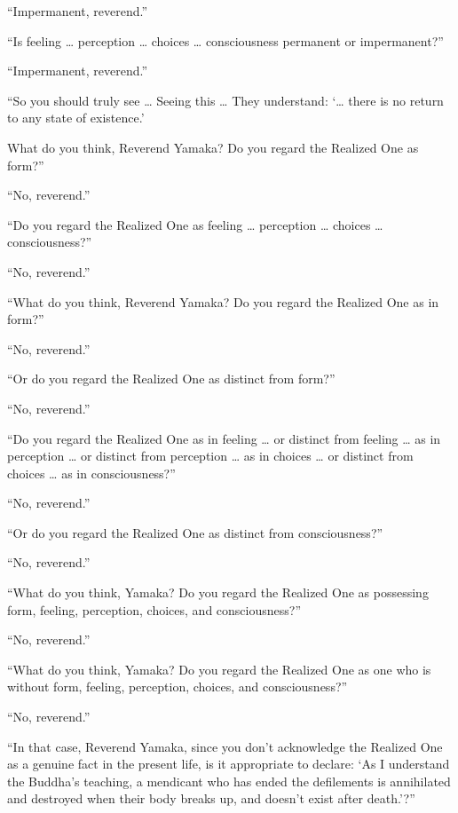 \documentclass[12pt,openany]{book}%
\begin{document}
“Impermanent, reverend.” 

“Is feeling … perception … choices … consciousness permanent or impermanent?” 

“Impermanent, reverend.” 

“So you should truly see … Seeing this … They understand: ‘… there is no return to any state of existence.’ 

What do you think, Reverend Yamaka? Do you regard the Realized One as form?” 

“No, reverend.” 

“Do you regard the Realized One as feeling … perception … choices … consciousness?” 

“No, reverend.” 

“What do you think, Reverend Yamaka? Do you regard the Realized One as in form?” 

“No, reverend.” 

“Or do you regard the Realized One as distinct from form?” 

“No, reverend.” 

“Do you regard the Realized One as in feeling … or distinct from feeling … as in perception … or distinct from perception … as in choices … or distinct from choices … as in consciousness?” 

“No, reverend.” 

“Or do you regard the Realized One as distinct from consciousness?” 

“No, reverend.” 

“What do you think, Yamaka? Do you regard the Realized One as possessing form, feeling, perception, choices, and consciousness?” 

“No, reverend.” 

“What do you think, Yamaka? Do you regard the Realized One as one who is without form, feeling, perception, choices, and consciousness?” 

“No, reverend.” 

“In that case, Reverend Yamaka, since you don’t acknowledge the Realized One as a genuine fact in the present life, is it appropriate to declare: ‘As I understand the Buddha’s teaching, a mendicant who has ended the defilements is annihilated and destroyed when their body breaks up, and doesn’t exist after death.’?” 
\end{document}
